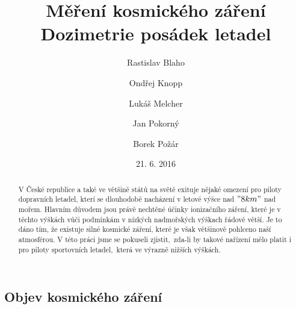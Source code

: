 \documentclass[12pt,a4paper]{article}
\begin{document}
\title{Měření kosmického záření\\Dozimetrie posádek letadel}
\author[1]{Rastislav Blaho}
\author[2]{Ondřej Knopp}
\author[3]{Lukáš Melcher}
\author[4]{Jan Pokorný}
\author[5]{Borek Požár}

\date{21. 6. 2016}

\maketitle

\thispagestyle{empty}

\begin{abstract}
V České republice a také ve většině států na světě exituje nějaké omezení pro
piloty dopravních letadel, kterí se dlouhodobě nacházení v letové výšce nad
$"8 km"$ nad mořem. Hlavním důvodem jsou právě nechtěné účinky ionizačního
záření, které je v těchto výškách vůči podmínkám v nízkých nadmořských výškach
řádově větší. Je to dáno tím, že existuje silné kosmické záření, které je však
většinově pohlceno naší atmosférou. V této práci jsme se pokuseli
zjistit,~zda-li by takové nařízení mělo platit i pro piloty sportovních
letadel,~která ve výrazně nižších výškách.
%

\end{abstract}
\subsection*{Objev kosmického záření}
\end{document}

